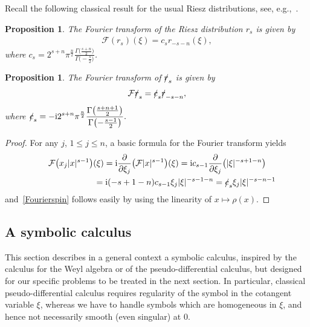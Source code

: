 \documentclass[pdftex]{sigma}
\newcommand{\fsl}[1]{{\slashed{#1}}} %
\numberwithin{equation}{section}
\newtheorem{prop}[theor]{Proposition}
\begin{document}
Recall the following classical result for the usual Riesz distributions, see, e.g.,~\cite{gs}.
\begin{prop}
The Fourier transform of the Riesz distribution $r_s$ is given by
\begin{gather*}
\mathcal F (r_s) (\xi) = c_s r_{-s-n}(\xi) ,
\end{gather*}
where $\displaystyle c_s= 2^{s+n} \pi^{\frac{n}{2}} \frac{\Gamma\big(\frac{s+n}{2}\big)}{\Gamma\big({-}\frac{s}{2}\big)}$.
\end{prop}


\begin{prop} The Fourier transform of $\fsl{r}_s$ is given by
\begin{gather}\label{Fourierspin}
\mathcal F \fsl{r}_s = \fsl{c}_s \fsl{r}_{-s-n},
\end{gather}
where
$
\displaystyle\fsl{c}_s= -{\rm i}2^{s+n}\pi^{\frac{n}{2}} \frac{\Gamma\big(\frac{s+n+1}{2}\big)}{\Gamma\big({-}\frac{s-1}{2}\big)} .
$
\end{prop}
\begin{proof}
For any $j$, $1\leq j\leq n$, a basic formula for the Fourier transform yields
\begin{gather*}
\mathcal F\big(x_j \vert x\vert^{s-1}\big)(\xi) = {\rm i}\frac{\partial}{\partial \xi_j} \big(\mathcal F \vert x\vert^{s-1}\big)(\xi)
= {\rm i} c_{s-1} \frac{\partial}{\partial \xi_j} \big(\vert \xi\vert^{-s+1-n}\big)
\\ \hphantom{\mathcal F\big(x_j \vert x\vert^{s-1}\big)(\xi)}
{}= {\rm i}(-s+1-n) c_{s-1} \xi_j\vert \xi\vert^{-s-1-n}= \fsl{c}_s \xi_j \vert \xi\vert^{-s-n-1}
\end{gather*}
and~\eqref{Fourierspin} follows easily by using the linearity of $x\mapsto \rho(x)$.
\end{proof}

\subsection{A symbolic calculus}\label{S43}
This section describes in a general context a symbolic calculus, inspired by the calculus for the Weyl algebra or of the pseudo-differential calculus, but designed for our specific problems to be treated in the next section. In particular, classical pseudo-differential calculus requires regularity of the symbol in the cotangent variable $\xi$, whereas we have to handle symbols which are homogeneous in $\xi$, and hence not necessarily smooth (even singular) at $0$.
\end{document}
